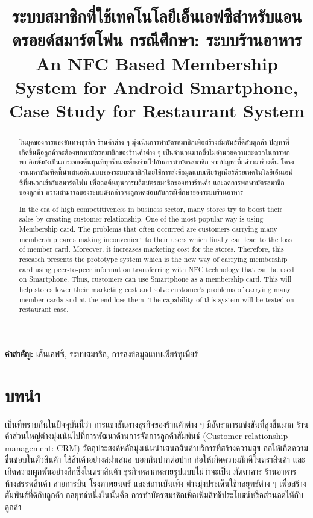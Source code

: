 \documentclass[12pt,a4paper,twocolumn]{article}
\title{ระบบสมาชิกที่ใช้เทคโนโลยีเอ็นเอฟซีสำหรับแอนดรอยด์สมาร์ตโฟน กรณีศึกษา: ระบบร้านอาหาร\\An NFC Based Membership System for Android Smartphone,\\Case Study for Restaurant System}
\author{}
\date{}
\renewcommand\abstractname{บทคัดย่อ}
\begin{document}
\maketitle
\thispagestyle{empty}
\pagestyle{empty}

\begin{abstract}
ในยุคของการแข่งขันทางธุรกิจ ร้านค้าต่าง ๆ มุ่งเน้นการทำบัตรสมาชิกเพื่อสร้างสัมพันธ์ที่ดีกับลูกค้า ปัญหาที่เกิดขึ้นคือลูกค้าจะต้องพกพาบัตรสมาชิกของร้านค้าต่าง ๆ เป็นจำนวนมากซึ่งไม่อำนวยความสะดวกในการพกพา อีกทั้งยังเป็นภาระของต้นทุนที่ทุกร้านจะต้องจ่ายไปกับการทำบัตรสมาชิก จากปัญหาที่กล่าวมาข้างต้น โครงงานมหาบัณฑิตนี้นำเสนอต้นแบบของระบบสมาชิกโดยใช้การส่งข้อมูลแบบเพียร์ทูเพียร์ด้วยเทคโนโลยีเอ็นเอฟซีที่ผนวกเข้ากับสมาร์ตโฟน เพื่อลดต้นทุนการผลิตบัตรสมาชิกของทางร้านค้า และลดการพกพาบัตรสมาชิกของลูกค้า ความสามารถของระบบดังกล่าวจะถูกทดสอบกับกรณีศึกษาของระบบร้านอาหาร
\end{abstract}

\renewcommand\abstractname{Abstract}
\begin{abstract}
In the era of high competitiveness in business sector, many stores try to boost their sales by creating customer relationship. One of the most popular way is using Membership card. The problems that often occurred are customers carrying many membership cards making inconvenient to their users which finally can lead to the loss of member card. Moreover, it increases marketing cost for the stores. Therefore, this research presents the prototype system which is the new way of carrying membership card using peer-to-peer information transferring with NFC technology that can be used on Smartphone. Thus, customers can use Smartphone as a membership card.  This will help stores lower their marketing cost and solve customer’s problems of carrying many member cards and at the end lose them. The capability of this system will be tested on restaurant case.
\end{abstract}

\noindent \textbf{คำสำคัญ:} เอ็นเอฟซี, ระบบสมาชิก, การส่งข้อมูลแบบเพียร์ทูเพียร์

\section{บทนำ}
เป็นที่ทราบกันในปัจจุบันนี้ว่า การแข่งขันทางธุรกิจของร้านค้าต่าง ๆ มีอัตราการแข่งขันที่สูงขึ้นมาก ร้านค้าส่วนใหญ่ต่างมุ่งเน้นไปที่การพัฒนาด้านการจัดการลูกค้าสัมพันธ์ (Customer relationship management: CRM) วัตถุประสงค์หลักมุ่งเน้นนำเสนอสินค้าบริการที่สร้างความสุข ก่อให้เกิดความชื่นชอบในตัวสินค้า ใช้สินค้าอย่างสม่ำเสมอ บอกกันปากต่อปาก ก่อให้เกิดความภักดีในตราสินค้า และเกิดความผูกพันอย่างลึกซึ้งในตราสินค้า ธุรกิจหลากหลายรูปแบบไม่ว่าจะเป็น ภัตตาคาร ร้านอาหาร ห้างสรรพสินค้า สายการบิน โรงภาพยนตร์ และสถานบันเทิง ต่างมุ่งประเด็นใช้กลยุทธ์ต่าง ๆ เพื่อสร้างสัมพันธ์ที่ดีกับลูกค้า กลยุทธ์หนึ่งในนั้นคือ การทำบัตรสมาชิกเพื่อเพิ่มสิทธิประโยชน์หรือส่วนลดให้กับลูกค้า
\end{document}
